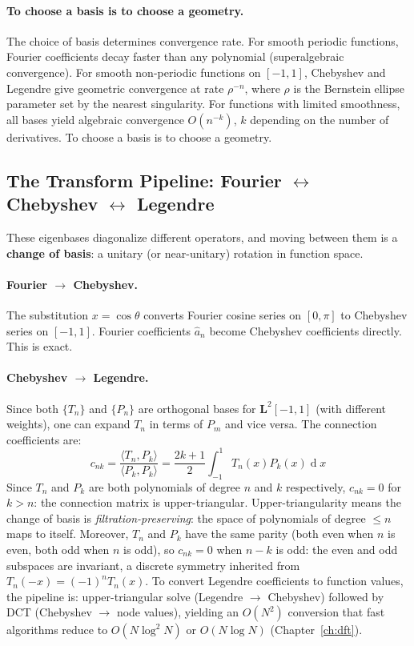 \documentclass[12pt,a4paper]{report}
\DeclareMathOperator{\deriv}{d}
\theoremstyle{thms}
\theoremstyle{defns}
\begin{document}
\paragraph{To choose a basis is to choose a geometry.} The choice of basis determines convergence rate. For smooth periodic functions, Fourier coefficients decay faster than any polynomial (superalgebraic convergence). For smooth non-periodic functions on $[-1, 1]$, Chebyshev and Legendre give geometric convergence at rate $\rho^{-n}$, where $\rho$ is the Bernstein ellipse parameter set by the nearest singularity. For functions with limited smoothness, all bases yield algebraic convergence $O(n^{-k})$, $k$ depending on the number of derivatives. To choose a basis is to choose a geometry.

\subsection{The Transform Pipeline: Fourier $\leftrightarrow$ Chebyshev $\leftrightarrow$ Legendre}
\label{sec:transform_pipeline}

These eigenbases diagonalize different operators, and moving between them is a \textbf{change of basis}: a unitary (or near-unitary) rotation in function space.

\paragraph{Fourier $\to$ Chebyshev.} The substitution $x = \cos\theta$ converts Fourier cosine series on $[0, \pi]$ to Chebyshev series on $[-1, 1]$. Fourier coefficients $\hat{a}_n$ become Chebyshev coefficients directly. This is exact.

\paragraph{Chebyshev $\to$ Legendre.} Since both $\{T_n\}$ and $\{P_n\}$ are orthogonal bases for $\mathbf{L}^2[-1, 1]$ (with different weights), one can expand $T_n$ in terms of $P_m$ and vice versa. The connection coefficients are:
\begin{equation}
    c_{nk} = \dfrac{\langle T_n, P_k \rangle}{\langle P_k, P_k \rangle} = \dfrac{2k + 1}{2}\int_{-1}^{1} T_n(x)P_k(x)\deriv{x}
\end{equation}
Since $T_n$ and $P_k$ are both polynomials of degree $n$ and $k$ respectively, $c_{nk} = 0$ for $k > n$: the connection matrix is upper-triangular. Upper-triangularity means the change of basis is \textit{filtration-preserving}: the space of polynomials of degree $\leq n$ maps to itself. Moreover, $T_n$ and $P_k$ have the same parity (both even when $n$ is even, both odd when $n$ is odd), so $c_{nk} = 0$ when $n - k$ is odd: the even and odd subspaces are invariant, a discrete symmetry inherited from $T_n(-x) = (-1)^n T_n(x)$. To convert Legendre coefficients to function values, the pipeline is: upper-triangular solve (Legendre $\to$ Chebyshev) followed by DCT (Chebyshev $\to$ node values), yielding an $O(N^2)$ conversion that fast algorithms reduce to $O(N\log^2 N)$ or $O(N\log N)$ (Chapter~\ref{ch:dft}).
\end{document}
